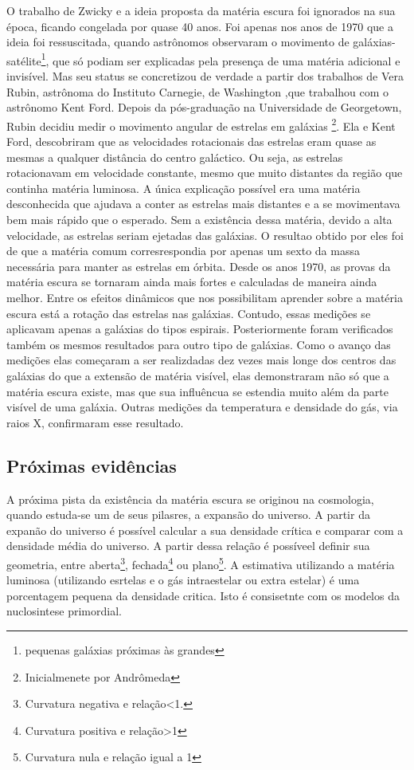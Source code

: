 \documentclass[
	article,			%
	11pt,				%
	twoside,			%
	a4paper,			%
	english,			%
	brazil,				%
	sumario=tradicional
	]{abntex2}
\begin{document}
O trabalho de Zwicky e a ideia proposta da matéria escura foi ignorados na sua época, ficando congelada por quase 40 anos. Foi apenas nos anos de 1970
que a ideia foi ressuscitada, quando astrônomos observaram o movimento de galáxias-satélite\footnote{pequenas
	galáxias próximas às grandes}, que só podiam ser explicadas pela presença de uma matéria adicional e invisível.
Mas seu status se concretizou de verdade a partir dos trabalhos de Vera Rubin, astrônoma do Instituto Carnegie, de Washington ,que trabalhou com o astrônomo Kent Ford. Depois da pós-graduação na Universidade de Georgetown,
Rubin decidiu medir o movimento angular de estrelas em galáxias \footnote{Inicialmenete  por Andrômeda}.
Ela e Kent Ford, descobriram que as
velocidades rotacionais das estrelas eram quase as mesmas a qualquer distância
do centro galáctico. Ou seja, as estrelas rotacionavam em velocidade constante,
mesmo que muito distantes da região que continha matéria luminosa. A única
explicação possível era uma matéria desconhecida que ajudava a conter
as estrelas mais distantes e a se movimentava bem mais rápido que o esperado. Sem
a existência dessa matéria, devido a alta velocidade, as estrelas seriam ejetadas das galáxias. O resultao obtido por eles foi de
que a matéria comum corresrespondia por apenas um sexto da massa
necessária para manter as estrelas em órbita.
Desde os anos 1970, as provas da matéria escura se tornaram ainda mais fortes e calculadas de maneira ainda melhor.
Entre os efeitos dinâmicos que nos possibilitam aprender sobre a matéria escura está a rotação das estrelas nas galáxias.
Contudo, essas medições se aplicavam apenas a galáxias do tipos espirais. Posteriormente foram verificados também os mesmos resultados para outro tipo de galáxias.
Como o avanço das medições elas começaram a ser realizdadas dez vezes mais longe dos centros das galáxias do que a extensão de matéria visível, elas
demonstraram não só que a matéria escura existe, mas que sua influêncua se estendia
muito além da parte visível de uma galáxia. Outras medições da temperatura e densidade
do gás, via raios X, conﬁrmaram esse resultado.

\subsection{Próximas evidências}

A próxima pista da existência da matéria escura se originou na cosmologia, quando estuda-se um de seus pilasres, a expansão do universo.
A partir da expanão do universo é possível calcular a sua densidade crítica e comparar com a densidade média do universo. A partir dessa relação
é possíveel definir sua geometria, entre aberta\footnote{Curvatura negativa e relação<1.}, fechada\footnote{Curvatura positiva e relação>1} ou plano\footnote{Curvatura nula e relação igual a 1}.
A estimativa utilizando a matéria luminosa (utilizando esrtelas e o gás intraestelar ou extra estelar) é uma porcentagem pequena da densidade critica. Isto é consisetnte com os modelos da nuclosintese primordial.
\end{document}
